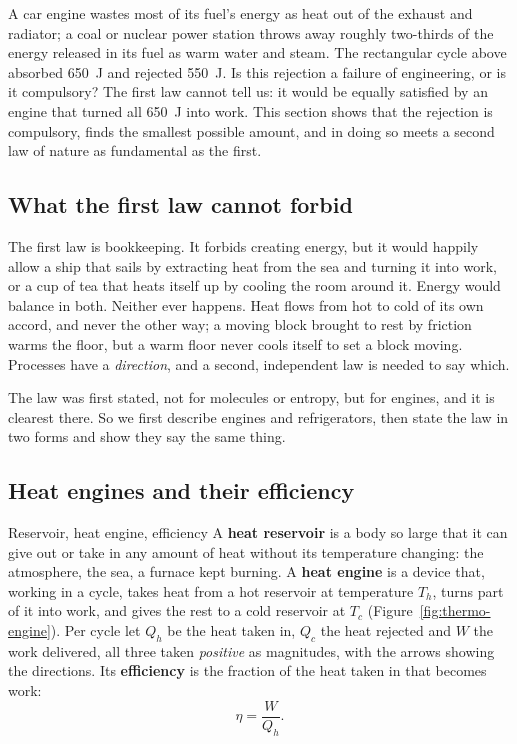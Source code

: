 A car engine wastes most of its fuel's energy as heat out of the exhaust and radiator; a coal or nuclear
power station throws away roughly two-thirds of the energy released in its fuel as warm water and
steam. The rectangular cycle above absorbed \SI{650}{J} and rejected \SI{550}{J}. Is this rejection a
failure of engineering, or is it compulsory? The first law cannot tell us: it would be equally satisfied
by an engine that turned all \SI{650}{J} into work. This section shows that the rejection is compulsory,
finds the smallest possible amount, and in doing so meets a second law of nature as fundamental as the
first.

\subsection{What the first law cannot forbid}

The first law is bookkeeping. It forbids creating energy, but it would happily allow a ship that sails by
extracting heat from the sea and turning it into work, or a cup of tea that heats itself up by cooling the
room around it. Energy would balance in both. Neither ever happens. Heat flows from hot to cold of its own
accord, and never the other way; a moving block brought to rest by friction warms the floor, but a warm
floor never cools itself to set a block moving. Processes have a \emph{direction}, and a second,
independent law is needed to say which.

The law was first stated, not for molecules or entropy, but for engines, and it is clearest there. So we
first describe engines and refrigerators, then state the law in two forms and show they say the same
thing.

\subsection{Heat engines and their efficiency}\label{sec:heatengine}

\begin{defbox}{Reservoir, heat engine, efficiency}
A \textbf{heat reservoir} is a body so large that it can give out or take in any amount of heat without
its temperature changing: the atmosphere, the sea, a furnace kept burning. A \textbf{heat engine} is a
device that, working in a cycle, takes heat from a hot reservoir at temperature $T_h$, turns part of it
into work, and gives the rest to a cold reservoir at $T_c$ (Figure~\ref{fig:thermo-engine}). Per cycle let
$Q_h$ be the heat taken in, $Q_c$ the heat rejected and $W$ the work delivered, all three taken
\emph{positive} as magnitudes, with the arrows showing the directions. Its \textbf{efficiency} is the
fraction of the heat taken in that becomes work:
\[
\eta=\frac{W}{Q_h}.
\]
\end{defbox}

